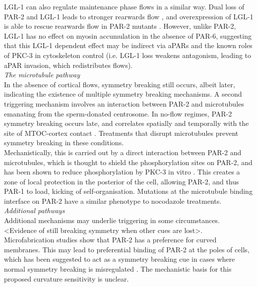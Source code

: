 \documentclass[12pt]{"report"}
\begin{document}
LGL-1 can also regulate maintenance phase flows in a similar way. Dual loss of PAR-2 and LGL-1 leads to stronger rearwards flow \citep{Beatty2010}, and overexpression of LGL-1 is able to rescue rearwards flow in PAR-2 mutants \citep{Hoege2010}. However, unlike PAR-2, LGL-1 has no effect on myosin accumulation in the absence of PAR-6, suggesting that this LGL-1 dependent effect may be indirect via aPARs and the known roles of PKC-3 in cytoskeleton control (i.e. LGL-1 loss weakens antagonism, leading to aPAR invasion, which redistributes flows).\\

\textit{The microtubule pathway}\\

In the absence of cortical flows, symmetry breaking still occurs, albeit later, indicating the existence of multiple symmetry breaking mechanisms. A second triggering mechanism involves an interaction between PAR-2 and microtubules emanating from the sperm-donated centrosome. In no-flow regimes, PAR-2 symmetry breaking occurs late, and correlates spatially and temporally with the site of MTOC-cortex contact \citep{Motegi2011}. Treatments that disrupt microtubules prevent symmetry breaking in these conditions.\\

Mechanistically, this is carried out by a direct interaction between PAR-2 and microtubules, which is thought to shield the phosphorylation sites on PAR-2, and has been shown to reduce phosphorylation by PKC-3 in vitro \citep{Motegi2011}. This creates a zone of local protection in the posterior of the cell, allowing PAR-2, and thus PAR-1 to load, kicking of self-organisation. Mutations at the microtubule binding interface on PAR-2 have a similar phenotype to nocodazole treatments.\\

\textit{Additional pathways}\\

Additional mechanisms may underlie triggering in some circumstances. <Evidence of still breaking symmetry when other cues are lost>. Microfabrication studies show that PAR-2 has a preference for curved membranes. This may lead to preferential binding of PAR-2 at the poles of cells, which has been suggested to act as a symmetry breaking cue in cases where normal symmetry breaking is misregulated \citep{Klinkert2019}. The mechanistic basis for this proposed curvature sensitivity is unclear.\\
\end{document}
